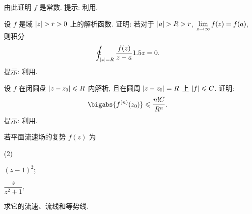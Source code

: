 \begin{homework}
\begin{homework}
    由此证明 $f$ 是常数.
    提示: 利用\thmGrowUp.
    \item 设 $f$ 是域 $\abs{z}>r>0$ 上的解析函数.
    证明: 若对于 $\abs{a}>R>r$, $\displaystyle\lim_{z\rightarrow\infty} f(z)=f(a)$, 则积分
    \[
      \oint_{\left|z\right|=R} \frac{f(z)}{z-a}1.5 z=0.
    \]
    提示: 利用\thmGrowUp.
    \item 设 $f$ 在闭圆盘 $\left|z-z_0\right|\leqslant R$ 内解析, 且在圆周 $\left|z-z_0\right|=R$ 上 $\left|f\right|\leqslant C$. 证明:
    \[
      \bigabs{f^{(n)}(z_0)}\le \frac{n!C}{R^n}.
    \]
    提示: 利用\thmGrowUp.
    \item \optionalex 若平面流速场的复势 $f(z)$ 为
    \begin{subhomework}(2)
      \item $(z-1)^2$;
      \item $\dfrac{z}{z^2+1}$,
    \end{subhomework}
    求它的流速、流线和等势线.
  \end{homework}
\end{homework}
\finishwidepage

